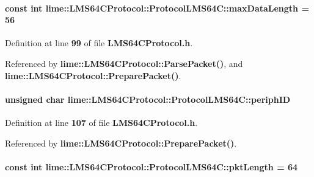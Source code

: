 \paragraph[{max\+Data\+Length}]{\setlength{\rightskip}{0pt plus 5cm}const {\bf int} lime\+::\+L\+M\+S64\+C\+Protocol\+::\+Protocol\+L\+M\+S64\+C\+::max\+Data\+Length = 56\hspace{0.3cm}{\ttfamily [static]}}\label{structlime_1_1LMS64CProtocol_1_1ProtocolLMS64C_af6d39565b238ba9929878f527017f58b}


Definition at line {\bf 99} of file {\bf L\+M\+S64\+C\+Protocol.\+h}.



Referenced by {\bf lime\+::\+L\+M\+S64\+C\+Protocol\+::\+Parse\+Packet()}, and {\bf lime\+::\+L\+M\+S64\+C\+Protocol\+::\+Prepare\+Packet()}.

\paragraph[{periph\+ID}]{\setlength{\rightskip}{0pt plus 5cm}unsigned char lime\+::\+L\+M\+S64\+C\+Protocol\+::\+Protocol\+L\+M\+S64\+C\+::periph\+ID}\label{structlime_1_1LMS64CProtocol_1_1ProtocolLMS64C_a104c0eb317789f11e31264afc7b54b2b}


Definition at line {\bf 107} of file {\bf L\+M\+S64\+C\+Protocol.\+h}.



Referenced by {\bf lime\+::\+L\+M\+S64\+C\+Protocol\+::\+Prepare\+Packet()}.

\paragraph[{pkt\+Length}]{\setlength{\rightskip}{0pt plus 5cm}const {\bf int} lime\+::\+L\+M\+S64\+C\+Protocol\+::\+Protocol\+L\+M\+S64\+C\+::pkt\+Length = 64\hspace{0.3cm}{\ttfamily [static]}}\label{structlime_1_1LMS64CProtocol_1_1ProtocolLMS64C_ae34f135a0370718e3590025c1bad03e2}


